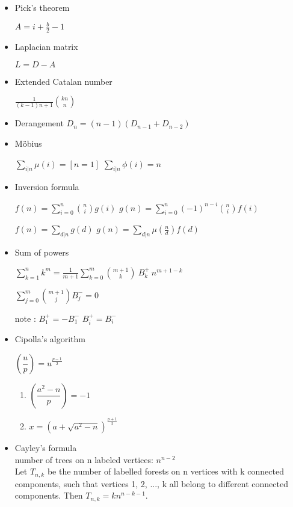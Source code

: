 \begin{itemize}

  \item Pick's theorem

  $A=i+\frac{b}{2}-1$

  \item Laplacian matrix

  $L = D - A$

  \item Extended Catalan number

  $\frac{1}{(k-1)n+1} {kn\choose n}$

  \item Derangement
  $D_n=(n-1)(D_{n-1}+D_{n-2})$

  \item Möbius

  $\sum\limits_{i|n} \mu(i)=[n=1]$
  $\sum\limits_{i|n} \phi(i)=n$

  \item Inversion formula

  $f(n)=\sum\limits_{i=0}^n{n \choose i}g(i)$
  $g(n)=\sum\limits_{i=0}^n(-1)^{n-i}{n \choose i}f(i)$

  $f(n)=\sum\limits_{d|n}g(d)$
  $g(n)=\sum\limits_{d|n}\mu(\frac{n}{d})f(d)$

  \item Sum of powers

  $\sum_{k=1}^{n} k^m=\frac{1}{m+1}\sum_{k=0}^{m}{{m+1}\choose{k}}~B^+_k~n^{m+1-k}$

  $\sum_{j=0}^{m}{m+1\choose j}B^-_j=0$

  note :
  $B^+_1=-B^-_1$
  $B^+_i=B^-_i$

  \item Cipolla's algorithm

  $\left(\dfrac{u}{p}\right)=u^{\frac{p-1}{2}}$

  \begin{enumerate}
      \item $\left(\dfrac{a^2-n}{p}\right)=-1$
      \item $x=(a+\sqrt{a^2-n})^{\frac{p+1}{2}}$
  \end{enumerate}

  \item Cayley's formula \\
  number of trees on n labeled vertices: $n^{n-2}$ \\
  Let $T_{n,k}$ be the number of labelled forests on n vertices with k connected components, such that vertices 1, 2, ..., k all belong to different connected components. Then $T_{n,k} = k n^{n-k-1}.$


\end{itemize}

